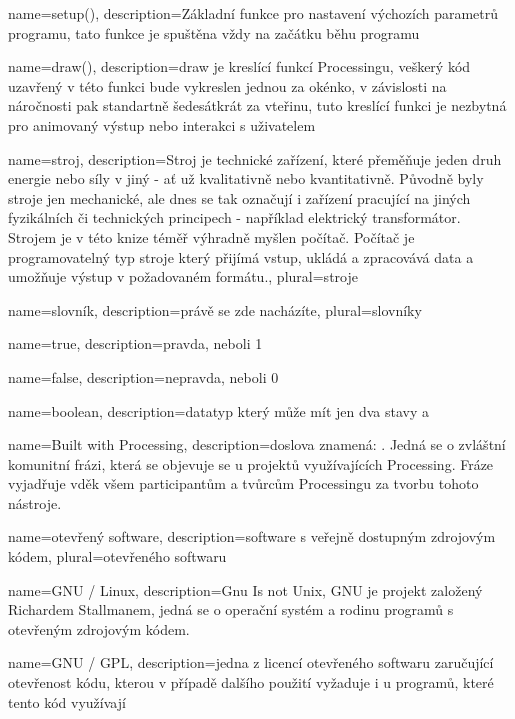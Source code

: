 {
  name={setup()},
  description={Základní funkce pro nastavení výchozích parametrů programu, tato funkce je spuštěna vždy na začátku běhu programu}
}

{
  name={draw()},
  description={draw je kreslící funkcí Processingu, veškerý kód uzavřený v této funkci bude vykreslen jednou za okénko, v závislosti na náročnosti pak standartně šedesátkrát za vteřinu, tuto kreslící funkci je nezbytná pro animovaný výstup nebo interakci s uživatelem}
}

{
  name={stroj},
  description={Stroj je technické zařízení, které přeměňuje jeden druh energie nebo síly v jiný - ať už kvalitativně nebo kvantitativně. Původně byly stroje jen mechanické, ale dnes se tak označují i zařízení pracující na jiných fyzikálních či technických principech - například elektrický transformátor. Strojem je v této knize téměř výhradně myšlen počítač. Počítač je programovatelný typ stroje který přijímá vstup, ukládá a zpracovává data a umožňuje výstup v požadovaném formátu.},
  plural={stroje}
}

{
  name={slovník},
  description={právě se zde nacházíte},
  plural={slovníky}
}


{
  name={true},
  description={pravda, neboli 1}
}

{
  name={false},
  description={nepravda, neboli 0}
}

{
  name={boolean},
  description={datatyp který může mít jen dva stavy  a }
}

{
	name={Built with Processing},
	description={doslova znamená: . Jedná se o zvláštní komunitní frázi, která se objevuje se u projektů využívajících Processing. Fráze vyjadřuje vděk všem participantům a tvůrcům Processingu za tvorbu tohoto nástroje.}
}

{
  name={otevřený software},
  description={software s veřejně dostupným zdrojovým kódem},
  plural={otevřeného softwaru}
}

{
  name={GNU / Linux},
  description={Gnu Is not Unix, GNU je projekt založený Richardem Stallmanem, jedná se o operační systém a rodinu programů s otevřeným zdrojovým kódem.}
}

{
  name={GNU / GPL},
  description={jedna z licencí otevřeného softwaru zaručující otevřenost kódu, kterou v případě dalšího použití vyžaduje i u programů, které tento kód využívají}
}

